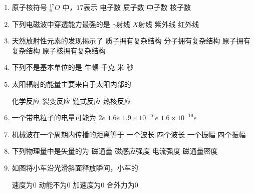 




\gaokaoxz


\begin{enumerate}
\item
原子核符号 $^{17}_{8} O $ 中，$ 17 $表示  
\fourchoices
{电子数}
{质子数}
{中子数}
{核子数}



\item
下列电磁波中穿透能力最强的是  
\fourchoices
{$ \gamma $射线}
{$ X $射线}
{紫外线}
{红外线}


\item 
天然放射性元素的发现揭示了  
\fourchoices
{质子拥有复杂结构}
{分子拥有复杂结构}
{原子拥有复杂结构}
{原子核拥有复杂结构}



\item
下列不是基本单位的是  
\fourchoices
{牛顿}
{千克}
{米}
{秒}


\item 
太阳辐射的能量主要来自于太阳内部的 

\fourchoices
{化学反应}
{裂变反应}
{链式反应}
{热核反应}




\item
一个带电粒子的电量可能为 
\fourchoices
{$2 e$}
{$1.6 e$}
{$1.9 \times 10^{-16} e$}
{$1.6 \times 10^{-19} e$}







\item 
机械波在一个周期内传播的距离等于  
\fourchoices
{一个波长}
{四个波长}
{一个振幅}
{四个振幅}



\item
下列物理量中是矢量的为  
\fourchoices
{磁通量}
{磁感应强度}
{电流强度}
{磁通量密度}


\item 
如图将小车沿光滑斜面释放瞬间，小车的  
\begin{figure}[h!]
\centering

\end{figure}

\fourchoices
{速度为$ 0 $}
{动能不为$ 0 $}
{加速度为$ 0 $}
{合外力为$ 0 $}




\end{enumerate}
